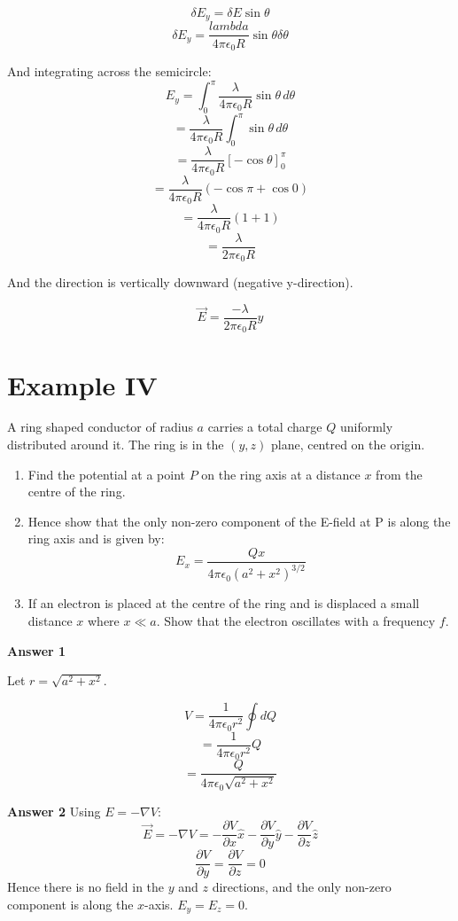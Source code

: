 \[
    \delta E_y = \delta E \sin \theta
\]
\[
    \delta E_y = \frac{lambda}{4 \pi \epsilon_0 R} \sin \theta \delta \theta
\]

And integrating across the semicircle:
\[
    E_y = \int_{0}^{\pi} \frac{\lambda}{4 \pi \epsilon_0 R} \sin \theta \, d \theta
\]
\[
    = \frac{\lambda}{4 \pi \epsilon_0 R} \int_0^\pi \sin \theta \, d \theta
\]
\[
    = \frac{\lambda}{4 \pi \epsilon_0 R} \left[ -\cos \theta \right]_0^\pi
\]
\[
    = \frac{\lambda}{4 \pi \epsilon_0 R} \left( -\cos \pi + \cos 0 \right)
\]
\[
    = \frac{\lambda}{4 \pi \epsilon_0 R} \left( 1 + 1 \right)
\]
\[
    = \frac{\lambda}{2 \pi \epsilon_0 R}
\]

And the direction is vertically downward (negative y-direction).

\[
    \vec{E} = \frac{- \lambda}{2 \pi \epsilon_0 R} \hat{y}
\]

\section{Example IV}
A ring shaped conductor of radius $a$ carries a total charge $Q$ uniformly distributed around it. The ring is in the $(y, z)$ plane, centred on the origin.

\begin{enumerate}
    \item Find the potential at a point $P$ on the ring axis at a distance $x$ from the centre of the ring.
    \item Hence show that the only non-zero component of the E-field at P is along the ring axis and is given by:
    \[
        E_x = \frac{Qx}{4 \pi \epsilon_0 (a^2 + x^2)^{3/2}}
    \]
    \item If an electron is placed at the centre of the ring and is displaced a small distance $x$ where $x \ll a$. Show that the electron oscillates with a frequency $f$.
    
\end{enumerate}

\textbf{Answer 1}

Let $r = \sqrt{a^2 + x^2}$.

\[
    V = \frac{1}{4 \pi \epsilon_0 r^2} \oint dQ
\]
\[
    = \frac{1}{4 \pi \epsilon_0 r^2} Q
\]
\[
    = \frac{Q}{4 \pi \epsilon_0 \sqrt{a^2 + x^2}}
\]

\textbf{Answer 2}
Using $E = - \nabla V$:
\[
    \vec{E} = - \nabla V = - \frac{\partial V}{\partial x} \hat{x} - \frac{\partial V}{\partial y} \hat{y} - \frac{\partial V}{\partial z} \hat{z}
\]
\[
    \frac{\partial V}{\partial y} = \frac{\partial V}{\partial z} = 0
\]
Hence there is no field in the $y$ and $z$ directions, and the only non-zero component is along the $x$-axis. $E_y = E_z = 0$.

